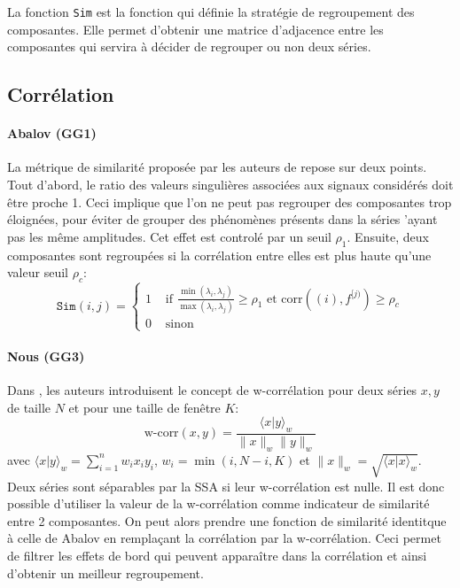 \documentclass{gretsi}
\begin{document}
La fonction \texttt{Sim} est la fonction qui définie la stratégie de regroupement des composantes. Elle permet d'obtenir une matrice d'adjacence entre les composantes qui servira à décider de regrouper ou non deux séries.\\

\subsection{Corrélation}

\paragraph{Abalov (GG1)}
\label{par:}
La métrique de similarité proposée par les auteurs de \cite{abalov_14_aut} repose sur deux points. Tout d'abord, le ratio des valeurs singulières associées aux signaux considérés doit être proche 1. Ceci implique que l'on ne peut pas regrouper des composantes trop éloignées, pour éviter de grouper des phénomènes présents dans la séries 'ayant pas les même amplitudes. Cet effet est controlé par un seuil $\rho_1$. Ensuite, deux composantes sont regroupées si la corrélation entre elles est plus haute qu'une valeur seuil $\rho_c$:
$$
\texttt{Sim}(i, j) = \begin{cases}
	1 &\text{ if } \displaystyle\frac{\min(\lambda_i, \lambda_j)}{\max(\lambda_i, \lambda_j)} \ge \rho_1 \text{ et } \text{corr}({(i)}, f^{[j)}) \ge \rho_c\\
	0& \text{ sinon}
\end{cases}
$$

\paragraph{Nous (GG3)}
\label{par:nn}

Dans \cite{GNZ_10_SSA}, les auteurs introduisent le concept de w-corrélation pour deux séries $x, y$ de taille $N$ et pour une taille de fenêtre $K$:$$
\text{w-corr}(x, y) = \frac{\langle x|y\rangle_w}{\|x\|_w\|y\|_w}
$$avec $\langle x|y\rangle_w = \sum_{i=1}^n w_i x_i y_i$, $w_i = \min(i, N-i, K)$ et $\|x\|_w = \sqrt{\langle x|x\rangle_w}$. Deux séries sont séparables par la SSA si leur w-corrélation est nulle. Il est donc possible d'utiliser la valeur de la w-corrélation comme indicateur de similarité entre 2 composantes. On peut alors prendre une fonction de similarité identitque à celle de Abalov en remplaçant la corrélation par la w-corrélation. Ceci permet de filtrer les effets de bord qui peuvent apparaître dans la corrélation et ainsi d'obtenir un meilleur regroupement.
\end{document}
